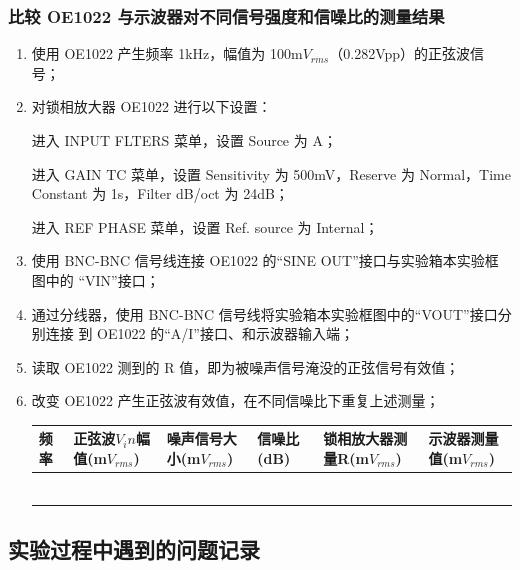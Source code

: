 \documentclass[11pt,a4paper]{ctexart}
\begin{document}
	\subsubsection{比较 OE1022 与示波器对不同信号强度和信噪比的测量结果}
	\begin{enumerate}
		\item 使用 OE1022 产生频率 1kHz，幅值为 100m$V_{rms}$（0.282Vpp）的正弦波信号；
		\item 对锁相放大器 OE1022 进行以下设置：
		
		进入 INPUT FLTERS 菜单，设置 Source 为 A；
		
		进入 GAIN TC 菜单，设置 Sensitivity 为 500mV，Reserve 为 Normal，Time Constant
		为 1s，Filter dB/oct 为 24dB；
		
		进入 REF PHASE 菜单，设置 Ref. source 为 Internal；
		\item 使用 BNC-BNC 信号线连接 OE1022 的“SINE OUT”接口与实验箱本实验框图中的
		“VIN”接口；
		\item 通过分线器，使用 BNC-BNC 信号线将实验箱本实验框图中的“VOUT”接口分别连接
		到 OE1022 的“A/I”接口、和示波器输入端；
		\item 读取 OE1022 测到的 R 值，即为被噪声信号淹没的正弦信号有效值；
		\item 改变 OE1022 产生正弦波有效值，在不同信噪比下重复上述测量；
		
		\begin{table}[H]
			\centering
			\begin{tabular}{|  p{2cm} | p{2cm} | p{2cm} | p{2cm} | p{2cm} | p{2cm} |}
				\hline
				频率 & 正弦波$V_in$幅值(m$V_{rms}$) & 噪声信号大小(m$V_{rms}$) & 信噪比(dB)&锁相放大器测量R(m$V_{rms}$) & 示波器测量值(m$V_{rms}$)\\
				\hline
				&  &  & & &  \\
				\hline
				&  &  &  & & \\
				\hline
				&  &  &  & & \\
				\hline
				&  &  &  & & \\
				\hline
				&  &  &  & & \\
				\hline
				&  &  &  & & \\
				\hline
				
			\end{tabular}
		\end{table}
	\end{enumerate}
\subsection{实验过程中遇到的问题记录}
\newpage
\end{document}
